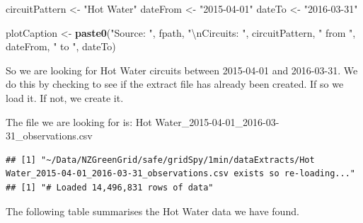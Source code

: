 \documentclass[]{article}
\newenvironment{Shaded}{\begin{snugshade}}{\end{snugshade}}
\newcommand{\KeywordTok}[1]{\textcolor[rgb]{0.13,0.29,0.53}{\textbf{#1}}}
\newcommand{\CharTok}[1]{\textcolor[rgb]{0.31,0.60,0.02}{#1}}
\newcommand{\StringTok}[1]{\textcolor[rgb]{0.31,0.60,0.02}{#1}}
\newcommand{\NormalTok}[1]{#1}
\begin{document}
\begin{Shaded}
\begin{Highlighting}[]
\NormalTok{circuitPattern <-}\StringTok{ "Hot Water"}
\NormalTok{dateFrom <-}\StringTok{ "2015-04-01"}
\NormalTok{dateTo <-}\StringTok{ "2016-03-31"}

\NormalTok{plotCaption <-}\StringTok{ }\KeywordTok{paste0}\NormalTok{(}\StringTok{"Source: "}\NormalTok{, fpath,}
                      \StringTok{"}\CharTok{\textbackslash{}n}\StringTok{Circuits: "}\NormalTok{, circuitPattern, }\StringTok{" from "}\NormalTok{, dateFrom, }\StringTok{" to "}\NormalTok{, dateTo)}
\end{Highlighting}
\end{Shaded}

So we are looking for Hot Water circuits between 2015-04-01 and
2016-03-31. We do this by checking to see if the extract file has
already been created. If so we load it. If not, we create it.

The file we are looking for is: Hot
Water\_2015-04-01\_2016-03-31\_observations.csv

\begin{verbatim}
## [1] "~/Data/NZGreenGrid/safe/gridSpy/1min/dataExtracts/Hot Water_2015-04-01_2016-03-31_observations.csv exists so re-loading..."
## [1] "# Loaded 14,496,831 rows of data"
\end{verbatim}

The following table summarises the Hot Water data we have found.
\end{document}
